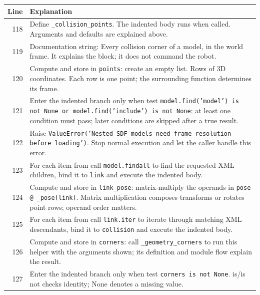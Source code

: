 \documentclass[11pt,a4paper]{book}
\begin{document}
\begin{longtable}{r p{}}

\textbf{Line} & \textbf{Explanation} \\ \hline \endhead

118 & Define \texttt{\_collision\_points}. The indented body runs when called. Arguments and defaults are explained above. \\

119 & Documentation string: Every collision corner of a model, in the world frame. It explains the block; it does not command the robot. \\

120 & Compute and store in \texttt{points}: create an empty list. Rows of 3D coordinates. Each row is one point; the surrounding function determines its frame. \\

121 & Enter the indented branch only when test \texttt{model.find('model') is not None or model.find('include') is not None}: at least one condition must pass; later conditions are skipped after a true result. \\

122 & Raise \texttt{ValueError('Nested SDF models need frame resolution before loading')}. Stop normal execution and let the caller handle this error. \\

123 & For each item from call \texttt{model.findall} to find the requested XML children, bind it to \texttt{link} and execute the indented body. \\

124 & Compute and store in \texttt{link\_pose}: matrix-multiply the operands in \texttt{pose @ \_pose(link)}. Matrix multiplication composes transforms or rotates point rows; operand order matters.  \\

125 & For each item from call \texttt{link.iter} to iterate through matching XML descendants, bind it to \texttt{collision} and execute the indented body. \\

126 & Compute and store in \texttt{corners}: call \texttt{\_geometry\_corners} to run this helper with the arguments shown; its definition and module flow explain the result.  \\

127 & Enter the indented branch only when test \texttt{corners is not None}. is/is not checks identity; None denotes a missing value. \\


\end{longtable}
\end{document}

